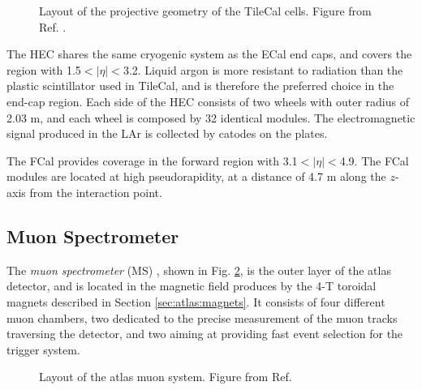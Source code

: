 \begin{figure}[ht]
\centering
{}
\caption{Layout of the projective geometry of the TileCal cells. Figure from Ref. \cite{atlas:atlas}.}
\label{fig:atlas:tile_cells}
\end{figure}

The HEC shares the same cryogenic system as the ECal end caps, and covers the region with 1.5$<|\eta|<$3.2. Liquid argon is more resistant to radiation than the plastic scintillator used in TileCal, and is therefore the preferred choice in the end-cap region. Each side of the HEC consists of two wheels with outer radius of 2.03 m, and each wheel is composed by 32 identical modules. The electromagnetic signal produced in the LAr is collected by catodes on the plates. 

The FCal provides coverage in the forward region with 3.1$<|\eta|<$4.9. The FCal modules are located at high pseudorapidity, at a distance of 4.7 m along the $z$-axis from the interaction point.


\subsection{Muon Spectrometer}

The \textit{muon spectrometer} (MS) \cite{ATLAS:1997ad}, shown in Fig. \ref{fig:atlas:muon}, is the outer layer of the \gls{atlas} detector, and is located in the magnetic field produces by the 4-T toroidal magnets described in Section \ref{sec:atlas:magnets}. It consists of four different muon chambers, two dedicated to the precise measurement of the muon tracks traversing the detector, and two aiming at providing fast event selection for the trigger system. 

\begin{figure}[ht]
\centering
{}
\caption{Layout of the \gls{atlas} muon system. Figure from Ref. \cite{atlas:atlas}}
\label{fig:atlas:muon}
\end{figure}

